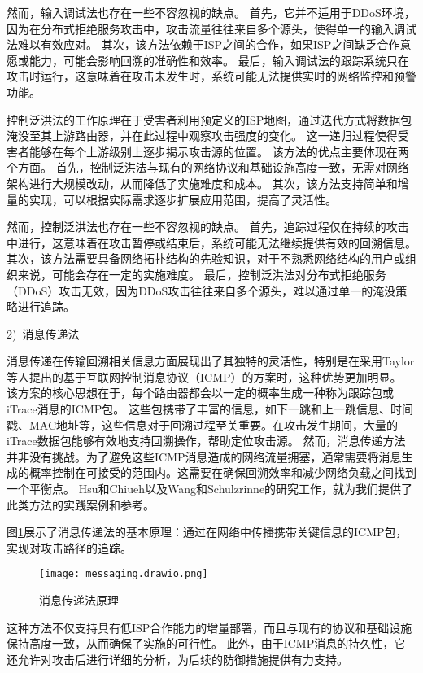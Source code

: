 然而，输入调试法也存在一些不容忽视的缺点。
首先，它并不适用于DDoS环境，因为在分布式拒绝服务攻击中，攻击流量往往来自多个源头，使得单一的输入调试法难以有效应对。
其次，该方法依赖于ISP之间的合作，如果ISP之间缺乏合作意愿或能力，可能会影响回溯的准确性和效率。
最后，输入调试法的跟踪系统只在攻击时运行，这意味着在攻击未发生时，系统可能无法提供实时的网络监控和预警功能。

控制泛洪法的工作原理在于受害者利用预定义的ISP地图，通过迭代方式将数据包淹没至其上游路由器，并在此过程中观察攻击强度的变化。
这一递归过程使得受害者能够在每个上游级别上逐步揭示攻击源的位置。
该方法的优点主要体现在两个方面。
首先，控制泛洪法与现有的网络协议和基础设施高度一致，无需对网络架构进行大规模改动，从而降低了实施难度和成本。
其次，该方法支持简单和增量的实现，可以根据实际需求逐步扩展应用范围，提高了灵活性。

然而，控制泛洪法也存在一些不容忽视的缺点。
首先，追踪过程仅在持续的攻击中进行，这意味着在攻击暂停或结束后，系统可能无法继续提供有效的回溯信息。
其次，该方法需要具备网络拓扑结构的先验知识，对于不熟悉网络结构的用户或组织来说，可能会存在一定的实施难度。
最后，控制泛洪法对分布式拒绝服务（DDoS）攻击无效，因为DDoS攻击往往来自多个源头，难以通过单一的淹没策略进行追踪。

2)~消息传递法\par
消息传递在传输回溯相关信息方面展现出了其独特的灵活性，特别是在采用Taylor等人提出的基于互联网控制消息协议（ICMP）的方案时，这种优势更加明显\cite{sikos2020packet}。
该方案的核心思想在于，每个路由器都会以一定的概率生成一种称为跟踪包或iTrace消息的ICMP包。
这些包携带了丰富的信息，如下一跳和上一跳信息、时间戳、MAC地址等，这些信息对于回溯过程至关重要。在攻击发生期间，大量的iTrace数据包能够有效地支持回溯操作，帮助定位攻击源。
然而，消息传递方法并非没有挑战。为了避免这些ICMP消息造成的网络流量拥塞，通常需要将消息生成的概率控制在可接受的范围内。这需要在确保回溯效率和减少网络负载之间找到一个平衡点。
Hsu和Chiueh\cite{Hsu2003TrafficSourceIdentification}以及Wang和Schulzrinne\cite{WangSchulzrinne2004DoS,WangSchulzrinne2004ReflectiveDoS}的研究工作，就为我们提供了此类方法的实践案例和参考。

图\ref{fig:messaging}展示了消息传递法的基本原理：通过在网络中传播携带关键信息的ICMP包，实现对攻击路径的追踪。
\begin{figure}[h]
  \centering
  \texttt{[image: messaging.drawio.png]}
  \caption{消息传递法原理}
  \label{fig:messaging}
\end{figure}
这种方法不仅支持具有低ISP合作能力的增量部署，而且与现有的协议和基础设施保持高度一致，从而确保了实施的可行性。
此外，由于ICMP消息的持久性，它还允许对攻击后进行详细的分析，为后续的防御措施提供有力支持。

